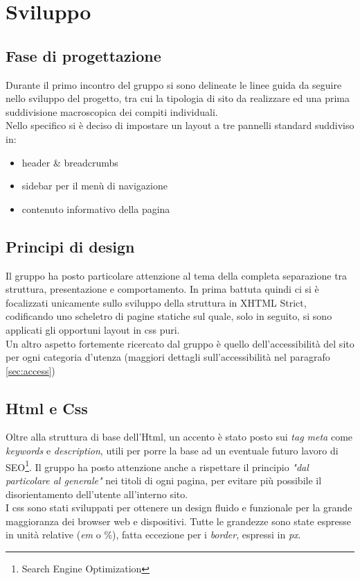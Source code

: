 \section{Sviluppo}

\vspace{8px}

\subsection{Fase di progettazione}
Durante il primo incontro del gruppo si sono delineate le linee guida da seguire nello sviluppo del progetto, tra cui la tipologia di sito da realizzare ed una prima suddivisione macroscopica dei compiti individuali.\\
Nello specifico si è deciso di impostare un layout a tre pannelli standard suddiviso in:
\begin{itemize}
 \item header \& breadcrumbs
 \item sidebar per il menù di navigazione
 \item contenuto informativo della pagina
\end{itemize}

\vspace{8px}

\subsection{Principi di design}
Il gruppo ha posto particolare attenzione al tema della completa separazione tra struttura, presentazione e comportamento. In prima battuta quindi ci si è focalizzati unicamente sullo sviluppo della struttura in XHTML Strict, codificando uno scheletro di pagine statiche sul quale, solo in seguito, si sono applicati gli opportuni layout in css puri.\\
Un altro aspetto fortemente ricercato dal gruppo è quello dell'accessibilità del sito per ogni categoria d'utenza (maggiori dettagli sull'accessibilità nel paragrafo \ref{sec:access})

\pagebreak

\subsection{Html e Css}
Oltre alla struttura di base dell'Html, un accento è stato posto sui \emph{tag meta} come \emph{keywords} e \emph{description}, utili per porre la base ad un eventuale futuro lavoro di SEO\footnote{Search Engine Optimization}. Il gruppo ha posto attenzione anche a rispettare il principio \emph{"dal particolare al generale"} nei titoli di ogni pagina, per evitare più possibile il disorientamento dell'utente all'interno sito.\\
I css sono stati sviluppati per ottenere un design fluido e funzionale per la grande maggioranza dei browser web e dispositivi. Tutte le grandezze sono state espresse in unità relative (\emph{em} o \%), fatta eccezione per i \emph{border}, espressi in \emph{px}.

